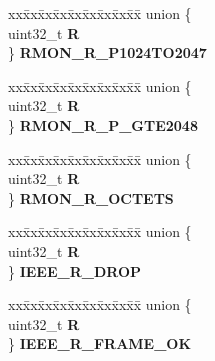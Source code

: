 \begin{DoxyCompactItemize}
\begin{tabbing}
\end{tabbing}\item 
\mbox{\label{structFEC__tag_a21cf33ea69f7dea75974f0732ee83957}} 
\begin{tabbing}
xx\=xx\=xx\=xx\=xx\=xx\=xx\=xx\=xx\=\kill
union \{\\
\>uint32\_t {\bfseries R}\\
\} {\bfseries RMON\_R\_P1024TO2047}\\

\end{tabbing}\item 
\mbox{\label{structFEC__tag_ac1a79b682e5745c4721a8c662f43ebb8}} 
\begin{tabbing}
xx\=xx\=xx\=xx\=xx\=xx\=xx\=xx\=xx\=\kill
union \{\\
\>uint32\_t {\bfseries R}\\
\} {\bfseries RMON\_R\_P\_GTE2048}\\

\end{tabbing}\item 
\mbox{\label{structFEC__tag_a2e4eb3bc0d4873ec2d42233cce7c3b70}} 
\begin{tabbing}
xx\=xx\=xx\=xx\=xx\=xx\=xx\=xx\=xx\=\kill
union \{\\
\>uint32\_t {\bfseries R}\\
\} {\bfseries RMON\_R\_OCTETS}\\

\end{tabbing}\item 
\mbox{\label{structFEC__tag_aeefa260d74c85cc54f446a1652e94d6a}} 
\begin{tabbing}
xx\=xx\=xx\=xx\=xx\=xx\=xx\=xx\=xx\=\kill
union \{\\
\>uint32\_t {\bfseries R}\\
\} {\bfseries IEEE\_R\_DROP}\\

\end{tabbing}\item 
\mbox{\label{structFEC__tag_a6044ddc2cf4ce3ad540972dc158c7bf9}} 
\begin{tabbing}
xx\=xx\=xx\=xx\=xx\=xx\=xx\=xx\=xx\=\kill
union \{\\
\>uint32\_t {\bfseries R}\\
\} {\bfseries IEEE\_R\_FRAME\_OK}\\


\end{tabbing}
\end{DoxyCompactItemize}

